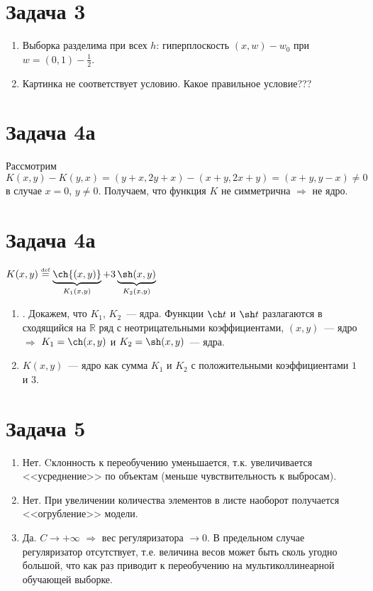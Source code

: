 \documentclass[a4paper]{article}
\def\eqdef{\overset{\mbox{\tiny def}}{=}}
\begin{document}
\section*{Задача 3}
\begin{enumerate}
\item Выборка разделима при всех $h$: гиперплоскость $(x,w)-w_0$ при $w=(0,1)-\frac{1}{2}$.
\item Картинка не соответствует условию. Какое правильное условие???
\end{enumerate}
\section*{Задача 4а}
Рассмотрим $K(x,y)-K(y,x)=(y+x,2y+x)-(x+y,2x+y)=(x+y,y-x)\neq0$ в случае $x=0$, $y\neq 0$. Получаем, что функция $K$ не симметрична $\Rightarrow$ не ядро.
\section*{Задача 4а}
$K(x,y)\eqdef \underbrace{\ch{(x,y)}}_{K_1(x,y)}+3\underbrace{\sh(x,y)}_{K_2(x,y)}$
\begin{enumerate}
\item. Докажем, что $K_1$, $K_2$~--- ядра. Функции $\ch t$ и $\sh t$ разлагаются в сходящийся на $\mathbb{R}$ ряд с неотрицательными коэффициентами, $(x,y)$~--- ядро $\Rightarrow$ $K_1=\ch (x,y)$ и $K_2=\sh (x,y)$~--- ядра.
\item $K(x,y)$~--- ядро как сумма $K_1$ и $K_2$ с положительными коэффициентами $1$ и $3$.
\end{enumerate}
\section*{Задача 5}
\begin{enumerate}
\item Нет. Cклонность к переобучению уменьшается, т.к. увеличивается <<усреднение>> по объектам (меньше чувствительность к выбросам). %
\item Нет. При увеличении количества элементов в листе наоборот получается <<огрубление>> модели.
\item Да. $C\to+\infty$ $\Rightarrow$ вес регуляризатора $\to 0$. В предельном случае регуляризатор отсутствует, т.е. величина весов может быть сколь угодно большой, что как раз приводит к переобучению на мультиколлинеарной обучающей выборке.
\end{enumerate}	
\end{document}
